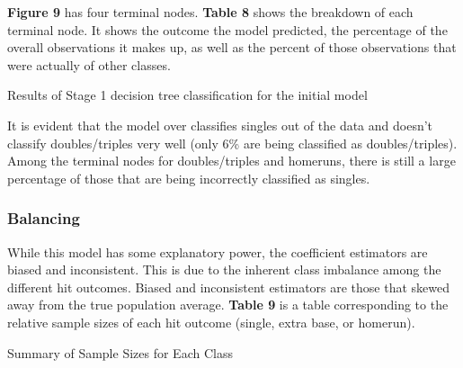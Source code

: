 \documentclass[
  letterpaper,
  DIV=11,
  numbers=noendperiod]{scrartcl}
\begin{document}
\textbf{Figure 9} has four terminal nodes. \textbf{Table 8} shows the
breakdown of each terminal node. It shows the outcome the model
predicted, the percentage of the overall observations it makes up, as
well as the percent of those observations that were actually of other
classes.

\begin{table}

\caption{\label{tbl-8}Results of Stage 1 decision tree classification
for the initial model}


\end{table}%

It is evident that the model over classifies singles out of the data and
doesn't classify doubles/triples very well (only \(6\)\% are being
classified as doubles/triples). Among the terminal nodes for
doubles/triples and homeruns, there is still a large percentage of those
that are being incorrectly classified as singles.

\subsubsection{Balancing}\label{balancing}

While this model has some explanatory power, the coefficient estimators
are biased and inconsistent. This is due to the inherent class imbalance
among the different hit outcomes. Biased and inconsistent estimators are
those that skewed away from the true population average. \textbf{Table
9} is a table corresponding to the relative sample sizes of each hit
outcome (single, extra base, or homerun).

\begin{table}

\caption{\label{tbl-9}Summary of Sample Sizes for Each Class}


\end{table}%
\end{document}

